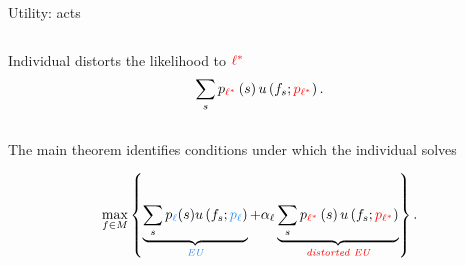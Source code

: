 \documentclass[usenames,dvipsnames,aspectratio=169,11pt]{beamer}
\begin{document}
\begin{frame}[noframenumbering]{Utility: acts}
\begin{center}
\begin{columns}
			\begin{column}{0.5\textwidth}
				Individual distorts the likelihood to \( \textcolor{red}{\ell^{*}} \)
				\vfill
				\[
					\sum_{s} p_{\textcolor{red}{\ell^{*}}} \left( s \right) u \left( f_{s} ; \textcolor{red}{p_{\ell^{*}}} \right).
				\]
			\end{column}
		\end{columns}
	\end{center}

	\vfill

	The main theorem identifies conditions under which the individual solves

	\vfill

	\[
		\max _{f \in M} \left\{ \underbrace{\sum_{s} p_{\textcolor{RoyalBlue}{\ell}}(s) u \left( f_{s}; \textcolor{RoyalBlue}{p_{\ell}} \right)}_{\text{\textit{\textcolor{RoyalBlue}{EU}}}} +
		\alpha_{\ell} \underbrace{\sum_{s} p_{\textcolor{red}{\ell^{*}}} \left( s \right) u \left( f_{s} ; \textcolor{red}{p_{\ell^{*}}} \right)}_{\text{\textit{\textcolor{red}{distorted EU}}}} \right\} .
	\]

\end{frame}
\end{document}
